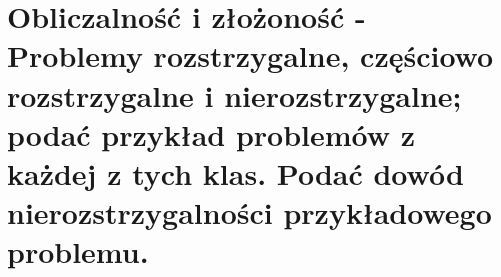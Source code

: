\section{Obliczalność i złożoność - Problemy rozstrzygalne, częściowo rozstrzygalne i nierozstrzygalne; podać przykład problemów z każdej z tych klas. Podać dowód nierozstrzygalności przykładowego problemu. }
